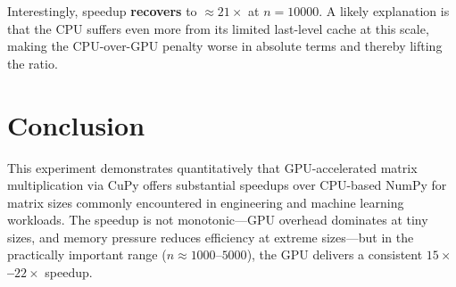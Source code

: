 \documentclass[12pt, a4paper]{article}
\begin{document}
Interestingly, speedup \textbf{recovers} to $\approx 21\times$ at $n = 10000$.  A likely explanation is that the CPU suffers even more from its limited last-level cache at this scale, making the CPU-over-GPU penalty worse in absolute terms and thereby lifting the ratio.


\section{Conclusion}

This experiment demonstrates quantitatively that GPU-accelerated matrix multiplication via CuPy offers substantial speedups over CPU-based NumPy for matrix sizes commonly encountered in engineering and machine learning workloads.  The speedup is not monotonic---GPU overhead dominates at tiny sizes, and memory pressure reduces efficiency at extreme sizes---but in the practically important range ($n \approx 1000$--$5000$), the GPU delivers a consistent \textbf{$15\times$--$22\times$} speedup.
\end{document}
